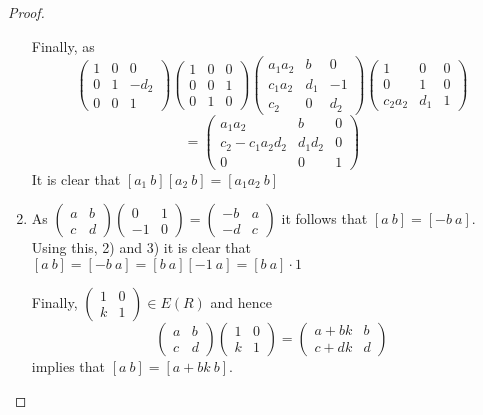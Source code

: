 \documentclass[a4paper,10pt]{article}
\begin{document}
\begin{proof}
\begin{enumerate}
Finally, as $$\begin{pmatrix} 1 & 0 & 0 \\ 0 & 1 & -d_{2} \\ 0 & 0 & 1 \end{pmatrix} \begin{pmatrix} 1 & 0 & 0 \\ 0 & 0 & 1 \\ 0 & 1 & 0 \end{pmatrix} \begin{pmatrix} a_{1}a_{2} & b & 0 \\ c_{1}a_{2} & d_{1} & -1 \\ c_{2} & 0 & d_{2}\end{pmatrix} \begin{pmatrix} 1 & 0 & 0 \\ 0 & 1 & 0 \\ c_{2}a_{2} & d_{1} & 1 \end{pmatrix}$$
$$=\begin{pmatrix} a_{1}a_{2} & b & 0 \\ c_{2}-c_{1}a_{2}d_{2} & d_{1}d_{2} & 0 \\ 0 & 0 & 1 \end{pmatrix}$$
It is clear that $[a_{1}\ b][a_{2}\ b]=[a_{1}a_{2}\ b]$
\item As $\begin{pmatrix} a & b \\ c & d \end{pmatrix}\begin{pmatrix} 0 & 1 \\ -1 & 0 \end{pmatrix}=\begin{pmatrix} -b & a \\ -d & c \end{pmatrix}$ it follows that $[a\ b]=[-b\ a]$. Using this, 2) and 3) it is clear that $[a\ b]=[-b\ a]=[b\ a][-1\ a]=[b\ a]\cdot 1$

Finally, $\begin{pmatrix} 1 & 0 \\ k & 1 \end{pmatrix}\in E(R)$ and hence $$\begin{pmatrix} a & b \\ c & d \end{pmatrix} \begin{pmatrix} 1 & 0 \\ k & 1 \end{pmatrix} = \begin{pmatrix} a+bk & b \\ c+dk & d \end{pmatrix}$$ implies that $[a\ b]=[a+bk\ b]$.
\end{enumerate}
\end{proof}
\end{document}
